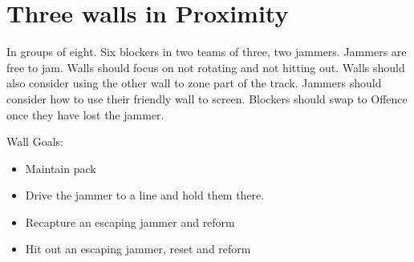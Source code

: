 \section*{Three walls in Proximity}
\label{drill:three_wall/proximity}

In groups of eight. 
Six blockers in two teams of three, two jammers.
Jammers are free to jam.
Walls should focus on not rotating and not hitting out.
Walls should also consider using the other wall to zone part of the track. 
Jammers should consider how to use their friendly wall to screen. 
Blockers should swap to Offence once they have lost the jammer.   

Wall Goals:
\begin{itemize}
\item Maintain pack
\item Drive the jammer to a line and hold them there.  
\item Recapture an escaping jammer and reform
\item Hit out an escaping jammer, reset and reform   
\end{itemize}
